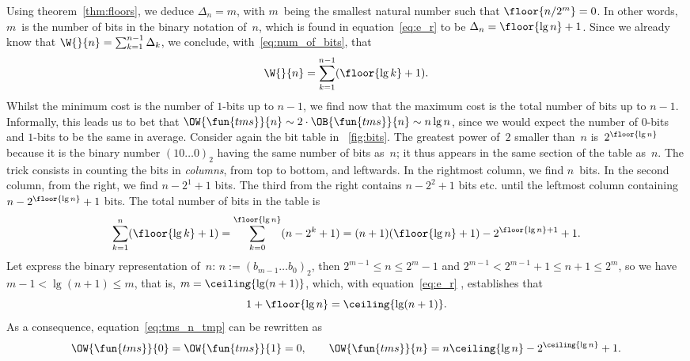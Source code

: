 Using theorem~\vref{thm:floors}, we deduce \(\Delta_n = m\), with
\(m\)~being the smallest natural number such that \(\floor{n/2^m} =
0\). In other words, \(m\)~is the number of bits in the binary
notation of~\(n\), which is found in equation~\eqref{eq:e_r} to be
\(\Delta_n = \floor{\lg n} + 1\). Since we already know that \(\W{}{n}
= \sum_{k=1}^{n-1}\Delta_k\), we conclude,
with~\eqref{eq:num_of_bits}, that
\begin{equation}
\W{}{n} = \sum_{k=1}^{n-1}(\floor{\lg k}+1).
\label{eq:tms_n_tmp}
\end{equation}
Whilst the minimum cost is the number of \(1\)-bits up to \(n-1\), we
find now that the maximum cost is the total number of bits up to
\(n-1\). Informally, this leads us to bet that \(\OW{\fun{tms}}{n}
\sim 2 \cdot \OB{\fun{tms}}{n} \sim n\lg n\), since we would expect
the number of \(0\)-bits and \(1\)-bits to be the same in
average. Consider again the bit table in \fig~\vref{fig:bits}. The
greatest power of~\(2\) smaller than~\(n\) is~\(2^{\floor{\lg n}}\)
because it is the binary number \((10\dots0)_2\) having the same
number of bits as~\(n\); it thus appears in the same section of the
table as~\(n\). The trick consists in counting the bits in
\emph{columns}, from top to bottom, and leftwards. In the rightmost
column, we find \(n\)~bits. In the second column, from the right, we
find \(n-2^1+1\) bits. The third from the right contains \(n-2^2+1\)
bits etc. until the leftmost column containing \(n-2^{\floor{\lg
    n}}+1\) bits. The total number of bits in the table is
\begin{equation*}
\abovedisplayskip=2pt
\belowdisplayskip=2pt
\sum_{k=1}^{n}{\!(\floor{\lg k}+1)}
   = \sum_{k=0}^{\floor{\lg n}}{\!(n-2^k+1)}
   = (n + 1)(\floor{\lg n} + 1) - 2^{\floor{\lg n}+1} + 1.
\end{equation*}
Let express the binary representation of~\(n\): \(n := (b_{m-1}\dots
b_0)_2\), then \(2^{m-1} \leqslant n \leqslant 2^m - 1\) and \(2^{m-1}
< 2^{m-1} + 1 \leqslant n + 1 \leqslant 2^m\), so we have \(m-1 <
\lg(n+1) \leqslant m\), that is, \(m = \ceiling{\lg(n+1)}\), which,
with equation~\eqref{eq:e_r} , establishes that
\begin{equation*}
  1 + \floor{\lg n} = \ceiling{\lg(n+1)}.
\end{equation*}
As a consequence, equation~\eqref{eq:tms_n_tmp} can be rewritten as
\begin{equation}
\OW{\fun{tms}}{0} = \OW{\fun{tms}}{1} = 0,
\qquad
\OW{\fun{tms}}{n} = n\ceiling{\lg n} - 2^{\ceiling{\lg n}} + 1.
\label{eq:top}
\end{equation}

